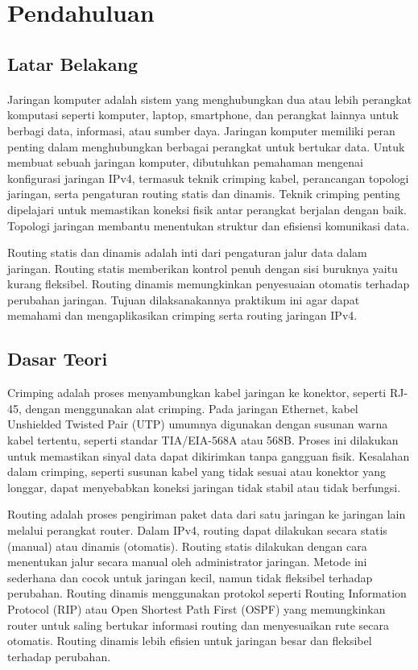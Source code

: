 \section{Pendahuluan}
\subsection{Latar Belakang}
\paragraph{} 
Jaringan komputer adalah sistem yang menghubungkan dua atau lebih perangkat komputasi seperti komputer, laptop, smartphone, dan perangkat lainnya untuk berbagi data, informasi, atau sumber daya. Jaringan komputer memiliki peran penting dalam menghubungkan berbagai perangkat untuk bertukar data. Untuk membuat sebuah jaringan komputer, dibutuhkan pemahaman mengenai konfigurasi jaringan IPv4, termasuk teknik crimping kabel, perancangan topologi jaringan, serta pengaturan routing statis dan dinamis. Teknik crimping penting dipelajari untuk memastikan koneksi fisik antar perangkat berjalan dengan baik. Topologi jaringan membantu menentukan struktur dan efisiensi komunikasi data.

Routing statis dan dinamis adalah inti dari pengaturan jalur data dalam jaringan. Routing statis memberikan kontrol penuh dengan sisi buruknya yaitu kurang fleksibel. Routing dinamis memungkinkan penyesuaian otomatis terhadap perubahan jaringan. Tujuan dilaksanakannya praktikum ini agar dapat memahami dan mengaplikasikan crimping serta routing jaringan IPv4.
\subsection{Dasar Teori}
Crimping adalah proses menyambungkan kabel jaringan ke konektor, seperti RJ-45, dengan menggunakan alat crimping. Pada jaringan Ethernet, kabel Unshielded Twisted Pair (UTP) umumnya digunakan dengan susunan warna kabel tertentu, seperti standar TIA/EIA-568A atau 568B. Proses ini dilakukan untuk memastikan sinyal data dapat dikirimkan tanpa gangguan fisik. Kesalahan dalam crimping, seperti susunan kabel yang tidak sesuai atau konektor yang longgar, dapat menyebabkan koneksi jaringan tidak stabil atau tidak berfungsi.

Routing adalah proses pengiriman paket data dari satu jaringan ke jaringan lain melalui perangkat router. Dalam IPv4, routing dapat dilakukan secara statis (manual) atau dinamis (otomatis). Routing statis dilakukan dengan cara menentukan jalur secara manual oleh administrator jaringan. Metode ini sederhana dan cocok untuk jaringan kecil, namun tidak fleksibel terhadap perubahan. Routing dinamis menggunakan protokol seperti Routing Information Protocol (RIP) atau Open Shortest Path First (OSPF) yang memungkinkan router untuk saling bertukar informasi routing dan menyesuaikan rute secara otomatis. Routing dinamis lebih efisien untuk jaringan besar dan fleksibel terhadap perubahan.

